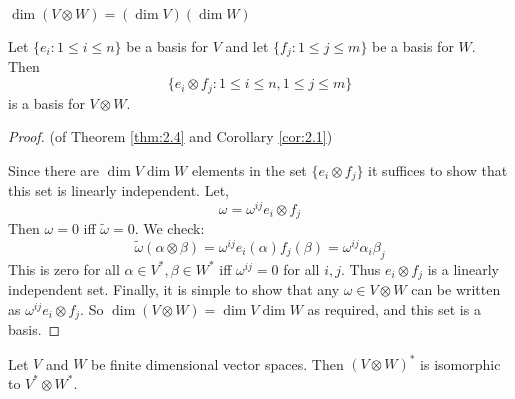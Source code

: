\begin{thm}\label{thm:2.4}
    $\dim(V\otimes W) = (\dim V)(\dim W)$
\end{thm}
\begin{cor}
    Let $\{e_i:1\leq i \leq n\}$ be a basis for $V$ and let $\{f_j:1\leq j\leq m\}$ be a basis for $W$. Then \[\{e_i\otimes f_j : 1\leq i\leq n, 1\leq j \leq m\}\]
    is a basis for $V \otimes W$. \label{cor:2.1}
\end{cor}
\begin{proof} (of Theorem \ref{thm:2.4} and Corollary \ref{cor:2.1})

Since there are $\dim V \dim W$ elements in the set $\{e_i\otimes f_j\}$ it suffices to show that this set is linearly independent. Let,
\[\omega = \omega^{ij} e_i \otimes f_j\]
Then $\omega = 0$ iff $\tilde{\omega}=0$. We check:
\[\tilde{\omega}(\alpha\otimes \beta) = \omega^{ij} e_i(\alpha)f_j(\beta) = \omega^{ij}\alpha_i \beta_j\]
This is zero for all $\alpha\in V^*,\beta\in W^*$ iff $\omega^{ij}=0$ for all $i,j$. Thus $e_i\otimes f_j$ is a linearly independent set. Finally, it is simple to show that any $\omega \in V\otimes W$ can be written as $\omega^{ij}e_i\otimes f_j$. So $\dim (V\otimes W)= \dim V \dim W$ as required, and this set is a basis.
\end{proof}

\begin{cor}
    Let $V$ and $W$ be finite dimensional vector spaces. Then $(V\otimes W)^*$ is isomorphic to $V^* \otimes W^*$.
\end{cor}


